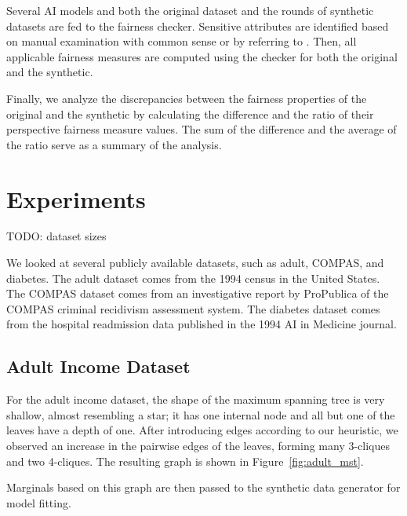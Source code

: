 \documentclass[manuscript,screen,review,anonymous]{acmart}
\begin{document}
Several AI models and both the original dataset and the rounds of synthetic datasets are fed to the fairness checker. Sensitive attributes are identified based on manual examination with common sense or by referring to \cite{pessach2022review}. Then, all applicable fairness measures are computed using the checker for both the original and the synthetic.

Finally, we analyze the discrepancies between the fairness properties of the original and the synthetic by calculating the difference and the ratio of their perspective fairness measure values. The sum of the difference and the average of the ratio serve as a summary of the analysis.

\section{Experiments}

TODO: dataset sizes

We looked at several publicly available datasets, such as adult\cite{adult_2,Kaggle_Adult_Census_Income}, COMPAS\cite{larson2016propublica,Kaggle_COMPAS_Dataset}, and diabetes\cite{diabetes_34,Kaggle_Diabetes_Prediction}. The adult dataset comes from the 1994 census in the United States. The COMPAS dataset comes from an investigative report by ProPublica of the COMPAS criminal recidivism assessment system. The diabetes dataset comes from the hospital readmission data published in the 1994 AI in Medicine journal.

\subsection{Adult Income Dataset}

For the adult income dataset, the shape of the maximum spanning tree is very shallow, almost resembling a star; it has one internal node and all but one of the leaves have a depth of one. After introducing edges according to our heuristic, we observed an increase in the pairwise edges of the leaves, forming many 3-cliques and two 4-cliques. The resulting graph is shown in Figure~\ref{fig:adult_mst}.

Marginals based on this graph are then passed to the synthetic data generator for model fitting.
\end{document}
